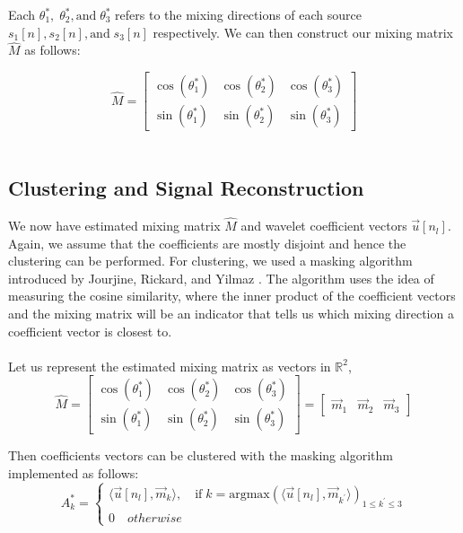 \documentclass[a4paper,11pt]{article}
\begin{document}
\noindent Each $\theta^{*}_1, \; \theta^{*}_2, \text{and} \;\theta^{*}_3$ refers to the mixing directions of each source $s_1[n], s_2[n], \text{and} \; s_3[n]$ respectively. We can then construct our mixing matrix $\hat{M}$ as follows:

\begin{equation}
\hat{M} = \begin{bmatrix}\cos(\theta^*_1)&\cos(\theta^*_2)&\cos(\theta^*_3)\\
\sin(\theta^*_1)&\sin(\theta^*_2)&\sin(\theta^*_3)
\end{bmatrix}
\end{equation} \\




\subsection{Clustering and Signal Reconstruction}

\noindent We now have estimated mixing matrix $\hat{M}$ and wavelet coefficient vectors $\vec{u}[n_l]$. Again, we assume that the coefficients are mostly disjoint and hence the clustering can be performed. For clustering, we used a masking algorithm introduced by Jourjine, Rickard, and Yilmaz \cite{1306640}. The algorithm uses the idea of measuring the cosine similarity, where the inner product of the coefficient vectors and the mixing matrix will be an indicator that tells us which mixing direction a coefficient vector is closest to. \\
\\
Let us represent the estimated mixing matrix as vectors in $\mathbb{R}^{2}$, 
\[
\hat{M} = 
\begin{bmatrix}\cos(\theta^*_1)&\cos(\theta^*_2)&\cos(\theta^*_3)\\
\sin(\theta^*_1)&\sin(\theta^*_2)&\sin(\theta^*_3)
\end{bmatrix}
=
\begin{bmatrix}\vec{m}_1&\vec{m}_2&\vec{m}_3
\end{bmatrix}
\]

\noindent Then coefficients vectors can be clustered with the masking algorithm implemented as follows:
\begin{equation}
    A^*_k=
    \begin{cases} 
    \langle \vec{u}[n_l], \vec{m}_k\rangle, \quad \text{if} \; k = \text{argmax}(\langle \vec{u}[n_l], \vec{m}_{k^{'}}\rangle)_{1 \leq k^{'} \leq 3} \\
    0 \quad otherwise 
   \end{cases}
\end{equation}
\end{document}
